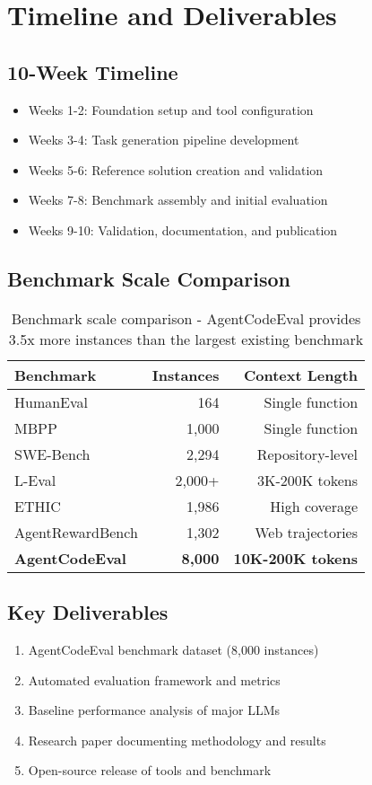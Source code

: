 \documentclass{article}
\begin{document}
\section{Timeline and Deliverables}

\subsection{10-Week Timeline}
\begin{itemize}
    \item Weeks 1-2: Foundation setup and tool configuration
    \item Weeks 3-4: Task generation pipeline development
    \item Weeks 5-6: Reference solution creation and validation
    \item Weeks 7-8: Benchmark assembly and initial evaluation
    \item Weeks 9-10: Validation, documentation, and publication
\end{itemize}

\subsection{Benchmark Scale Comparison}
\begin{table}[h]
\centering
\begin{tabular}{@{}lrr@{}}
\toprule
Benchmark & Instances & Context Length \\
\midrule
HumanEval & 164 & Single function \\
MBPP & 1,000 & Single function \\
SWE-Bench & 2,294 & Repository-level \\
L-Eval & 2,000+ & 3K-200K tokens \\
ETHIC & 1,986 & High coverage \\
AgentRewardBench & 1,302 & Web trajectories \\
\textbf{AgentCodeEval} & \textbf{8,000} & \textbf{10K-200K tokens} \\
\bottomrule
\end{tabular}
\caption{Benchmark scale comparison - AgentCodeEval provides 3.5x more instances than the largest existing benchmark}
\end{table}

\subsection{Key Deliverables}
\begin{enumerate}
    \item AgentCodeEval benchmark dataset (8,000 instances)
    \item Automated evaluation framework and metrics
    \item Baseline performance analysis of major LLMs
    \item Research paper documenting methodology and results
    \item Open-source release of tools and benchmark
\end{enumerate}
\end{document}
